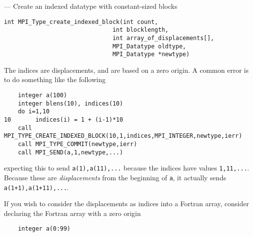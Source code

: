 \startmanpage
{}
--- Create an indexed datatype with constant-sized blocks 
\startvb\begin{verbatim}
int MPI_Type_create_indexed_block(int count,
                               int blocklength,
                               int array_of_displacements[],
                               MPI_Datatype oldtype,
                               MPI_Datatype *newtype)

\end{verbatim}
\endvb

\par
{}
\par
{}
The indices are displacements, and are based on a zero origin.  A common error
is to do something like the following
\begin{verbatim}
    integer a(100)
    integer blens(10), indices(10)
    do i=1,10
10       indices(i) = 1 + (i-1)*10
    call MPI_TYPE_CREATE_INDEXED_BLOCK(10,1,indices,MPI_INTEGER,newtype,ierr)
    call MPI_TYPE_COMMIT(newtype,ierr)
    call MPI_SEND(a,1,newtype,...)
\end{verbatim}

expecting this to send {\tt a(1),a(11),...} because the indices have values
{\tt 1,11,...}.   Because these are {\em displacements} from the beginning of {\tt a},
it actually sends {\tt a(1+1),a(1+11),...}.
\par
If you wish to consider the displacements as indices into a Fortran array,
consider declaring the Fortran array with a zero origin
\begin{verbatim}
    integer a(0:99)
\end{verbatim}

